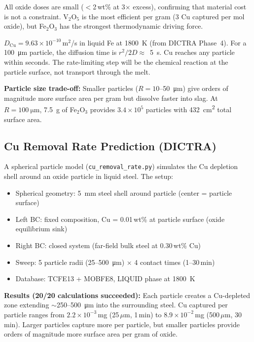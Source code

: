 \documentclass[11pt]{article}
\begin{document}
All oxide doses are small ($<$2\,wt\% at 3$\times$ excess), confirming that material cost is not a constraint. V$_2$O$_5$ is the most efficient per gram (3 Cu captured per mol oxide), but Fe$_2$O$_3$ has the strongest thermodynamic driving force.

\begin{insight}
$D_{\text{Cu}} = 9.63 \times 10^{-10}$\,m$^2$/s in liquid Fe at \SI{1800}{\kelvin} (from DICTRA Phase~4). For a \SI{100}{\micro\meter} particle, the diffusion time is $r^2/2D \approx$~\SI{5}{\second}. Cu reaches any particle within seconds. The rate-limiting step will be the chemical reaction at the particle surface, not transport through the melt.
\end{insight}

\textbf{Particle size trade-off:} Smaller particles ($R = 10$--\SI{50}{\micro\meter}) give orders of magnitude more surface area per gram but dissolve faster into slag. At $R = \SI{100}{\micro\meter}$, \SI{7.5}{\gram} of Fe$_2$O$_3$ provides $3.4 \times 10^5$ particles with \SI{432}{\centi\meter\squared} total surface area.

\subsection{Cu Removal Rate Prediction (DICTRA)}

A spherical particle model (\texttt{cu\_removal\_rate.py}) simulates the Cu depletion shell around an oxide particle in liquid steel. The setup:

\begin{itemize}[leftmargin=*]
    \item Spherical geometry: \SI{5}{\milli\meter} steel shell around particle (center = particle surface)
    \item Left BC: fixed composition, Cu = 0.01\,wt\% at particle surface (oxide equilibrium sink)
    \item Right BC: closed system (far-field bulk steel at 0.30\,wt\% Cu)
    \item Sweep: 5 particle radii (25--\SI{500}{\micro\meter}) $\times$ 4 contact times (1--30\,min)
    \item Database: TCFE13 + MOBFE8, LIQUID phase at \SI{1800}{\kelvin}
\end{itemize}

\textbf{Results (20/20 calculations succeeded):} Each particle creates a Cu-depleted zone extending $\sim$250--\SI{500}{\micro\meter} into the surrounding steel. Cu captured per particle ranges from $2.2 \times 10^{-3}$\,mg (25\,$\mu$m, 1\,min) to $8.9 \times 10^{-2}$\,mg (500\,$\mu$m, 30\,min). Larger particles capture more per particle, but smaller particles provide orders of magnitude more surface area per gram of oxide.
\end{document}
